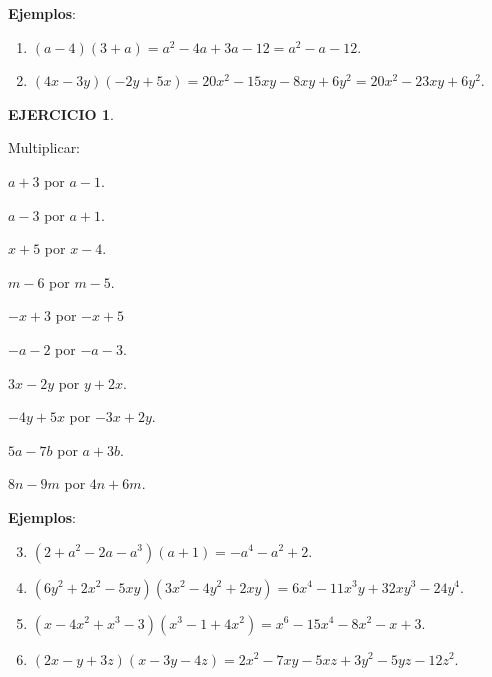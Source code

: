 \documentclass[12pt,letterpaper]{article}
\theoremstyle{definition}
\newtheorem{ejer}{EJERCICIO}
\begin{document}
\textbf{Ejemplos}:
\begin{enumerate}
\item $(a-4)(3+a)=a^2-4a+3a-12=a^2-a-12$.
\item $(4x-3y)(-2y+5x)=20x^2-15xy-8xy+6y^2=20x^2-23xy+6y^2$.
\end{enumerate}

\begin{ejer}\

Multiplicar: %
\begin{enumerate}
\begin{multicols}{3}
\item $a+3$ por $a-1$.
\item $a-3$ por $a+1$.
\item $x+5$ por $x-4$.
\item $m-6$ por $m-5$.
\item $-x+3$ por $-x+5$
\item $-a-2$ por $-a-3$.
\item $3x-2y$ por $y+2x$.
\item $-4y+5x$ por $-3x+2y$.
\item $5a-7b$ por $a+3b$.
\item $8n-9m$ por $4n+6m$. %
\end{multicols}
\end{enumerate}
\end{ejer}

\vspace{1mm}

\textbf{Ejemplos}: %
\begin{enumerate}
\setcounter{enumi}{2}
\item $(2+a^2-2a-a^3)(a+1)=-a^4-a^2+2$.
\item $(6y^2+2x^2-5xy)(3x^2-4y^2+2xy)=6x^4-11x^3y+32xy^3-24y^4$.
\item $(x-4x^2+x^3-3)(x^3-1+4x^2)=x^6-15x^4-8x^2-x+3$.
\item $(2x-y+3z)(x-3y-4z)=2x^2-7xy-5xz+3y^2-5yz-12z^2$.
\end{enumerate}

\vspace{1mm}
\end{document}
